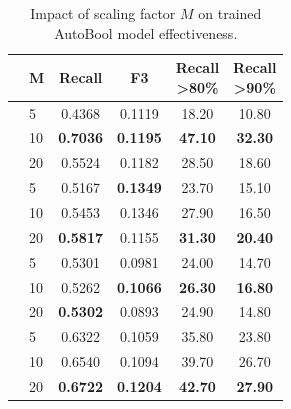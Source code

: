 \begin{table}[t]
	\small
	\centering
	\caption{Impact of scaling factor $M$ on trained AutoBool model effectiveness.}
	\label{tab:eval-results-m-values}

	\begin{tabular}{llcccc}
		\toprule
		 & M& Recall & F3 & \parbox{2.5em}{Recall\\>80\%}  & \parbox{2.5em}{Recall\\>90\%}  \\
		\midrule
		 & 5 & 0.4368 & 0.1119 & 18.20 & 10.80 \\
		& 10 & \textbf{0.7036} & \textbf{0.1195} & \textbf{47.10} & \textbf{32.30} \\
		& 20 & 0.5524 & 0.1182 & 28.50 & 18.60 \\
		\midrule
		 & 5 & 0.5167 & \textbf{0.1349} & 23.70 & 15.10 \\
		& 10 & 0.5453 & 0.1346 & 27.90 & 16.50 \\
		& 20 & \textbf{0.5817} & 0.1155 & \textbf{31.30} & \textbf{20.40} \\
		\midrule
		 & 5 & 0.5301 & 0.0981 & 24.00 & 14.70 \\
		& 10 & 0.5262 & \textbf{0.1066} & \textbf{26.30} & \textbf{16.80} \\
		& 20 & \textbf{0.5302} & 0.0893 & 24.90 & 14.80 \\
		\midrule
		 & 5 & 0.6322 & 0.1059 & 35.80 & 23.80 \\
		& 10 & 0.6540 & 0.1094 & 39.70 & 26.70 \\
		& 20 & \textbf{0.6722} & \textbf{0.1204} & \textbf{42.70} & \textbf{27.90} \\
		\bottomrule
	\end{tabular}

\end{table}


